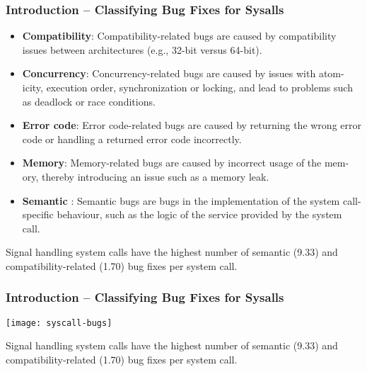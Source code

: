 \begin{frame}[plain]
	\frametitle{Introduction -- Classifying  Bug Fixes for Sysalls}
	
	
	
	\begin{itemize}\large
		\item \textbf{Compatibility}: Compatibility-related bugs are caused by compatibility
		issues between architectures (e.g., 32-bit versus 64-bit).
		
		
		\item \textbf{Concurrency}: Concurrency-related bugs are caused by issues with atom-
		icity, execution order, synchronization or locking, and lead to problems
		such as deadlock or race conditions.
		\item \textbf{Error code}: Error code-related bugs are caused by returning the wrong
		error code or handling a returned error code incorrectly.
		\item \textbf{Memory}: Memory-related bugs are caused by incorrect usage of the mem-
		ory, thereby introducing an issue such as a memory leak.
		\item \textbf{Semantic} : Semantic bugs are bugs in the implementation of the system
		call-specific behaviour, such as the logic of the service provided by the
		system call.
		
		
	\end{itemize}
	
	Signal handling system calls have the highest number of semantic
	(9.33) and compatibility-related (1.70) bug fixes per system call.
	
\end{frame}


\begin{frame}[plain]
	\frametitle{Introduction -- Classifying  Bug Fixes for Sysalls}
	
	
	
		\centering
	\texttt{[image: syscall-bugs]}
	
	Signal handling system calls have the highest number of semantic
	(9.33) and compatibility-related (1.70) bug fixes per system call.
	
\end{frame}



